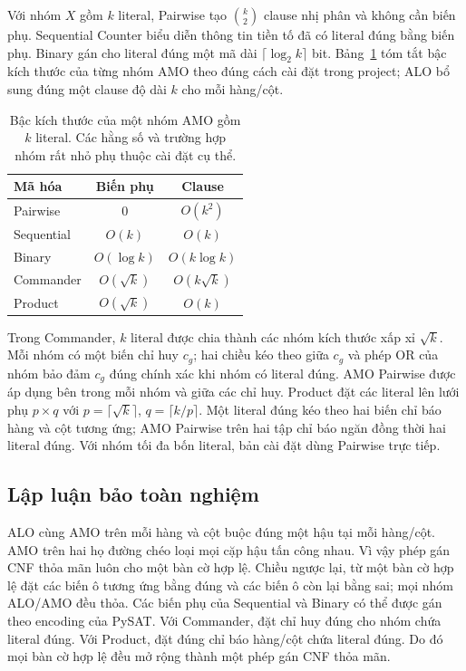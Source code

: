 \documentclass[a4paper,fleqn]{cas-sc}
\providecommand{\ReportPrefix}{}
\begin{document}
Với nhóm $X$ gồm $k$ literal, Pairwise tạo $\binom{k}{2}$ clause nhị phân và
không cần biến phụ. Sequential Counter biểu diễn thông tin tiền tố đã có
literal đúng bằng biến phụ. Binary gán cho literal đúng một mã dài
$\lceil\log_2 k\rceil$ bit. Bảng~\ref{tab:amo-complexity} tóm tắt bậc kích
thước của từng nhóm AMO theo đúng cách cài đặt trong project; ALO bổ sung đúng
một clause độ dài $k$ cho mỗi hàng/cột.

\begin{table}[htbp]
  \centering
  \caption{Bậc kích thước của một nhóm AMO gồm $k$ literal. Các hằng số và
  trường hợp nhóm rất nhỏ phụ thuộc cài đặt cụ thể.}
  \label{tab:amo-complexity}
  \begin{tabular}{lcc}
    \toprule
    Mã hóa & Biến phụ & Clause \\
    \midrule
    Pairwise & $0$ & $O(k^2)$ \\
    Sequential & $O(k)$ & $O(k)$ \\
    Binary & $O(\log k)$ & $O(k\log k)$ \\
    Commander & $O(\sqrt{k})$ & $O(k\sqrt{k})$ \\
    Product & $O(\sqrt{k})$ & $O(k)$ \\
    \bottomrule
  \end{tabular}
\end{table}

Trong Commander, $k$ literal được chia thành các nhóm kích thước xấp xỉ
$\sqrt{k}$. Mỗi nhóm có một biến chỉ huy $c_g$; hai chiều kéo theo giữa
$c_g$ và phép OR của nhóm bảo đảm $c_g$ đúng chính xác khi nhóm có literal
đúng. AMO Pairwise được áp dụng bên trong mỗi nhóm và giữa các chỉ huy. Product
đặt các literal lên lưới phụ $p\times q$ với $p=\lceil\sqrt{k}\rceil$,
$q=\lceil k/p\rceil$. Một literal đúng kéo theo hai biến chỉ báo hàng và cột
tương ứng; AMO Pairwise trên hai tập chỉ báo ngăn đồng thời hai literal đúng.
Với nhóm tối đa bốn literal, bản cài đặt dùng Pairwise trực tiếp.

\ifdefined\FullReport

\fi

\subsection{Lập luận bảo toàn nghiệm}

ALO cùng AMO trên mỗi hàng và cột buộc đúng một hậu tại mỗi hàng/cột. AMO
trên hai họ đường chéo loại mọi cặp hậu tấn công nhau. Vì vậy phép gán CNF
thỏa mãn luôn cho một bàn cờ hợp lệ. Chiều ngược lại, từ một bàn cờ hợp lệ
đặt các biến ô tương ứng bằng đúng và các biến ô còn lại bằng sai; mọi nhóm
ALO/AMO đều thỏa. Các biến phụ của Sequential và Binary có thể được gán
theo encoding của PySAT. Với Commander, đặt chỉ huy đúng cho nhóm chứa
literal đúng. Với Product, đặt đúng chỉ báo hàng/cột chứa literal đúng. Do
đó mọi bàn cờ hợp lệ đều mở rộng thành một phép gán CNF thỏa mãn.
\end{document}

